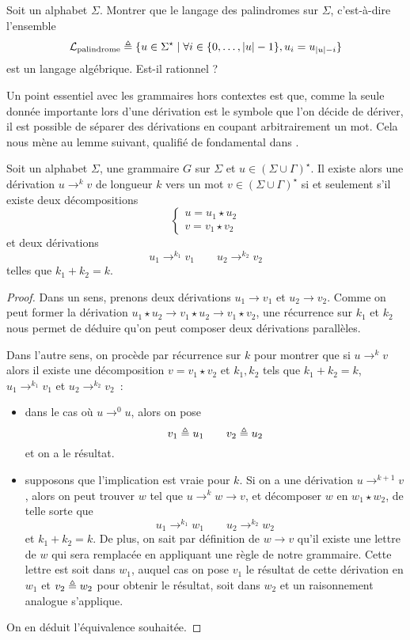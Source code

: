 \begin{exercise}
  Soit un alphabet $\Sigma$. Montrer que le langage des palindromes sur
  $\Sigma$, c'est-à-dire l'ensemble
  \[\mathcal L_{\mathrm{palindrome}} \triangleq \{u \in \Sigma^\star \mid
  \forall i \in \{0,\ldots,|u|-1\}, u_i = u_{|u|-i}\}\]
  est un langage algébrique. Est-il rationnel ?
\end{exercise}

Un point essentiel avec les grammaires hors contextes est que, comme la seule
donnée importante lors d'une dérivation est le symbole que l'on décide de
dériver, il est possible de séparer des dérivations en coupant arbitrairement un
mot. Cela nous mène au lemme suivant, qualifié de fondamental dans
\cite{carton2008langages}.

\begin{lemma}
  Soit un alphabet $\Sigma$, une grammaire $G$ sur $\Sigma$ et
  $u \in (\Sigma\cup\Gamma)^\star$. Il existe alors une dérivation $u \to^k v$
  de longueur $k$ vers un mot $v \in (\Sigma\cup\Gamma)^\star$ si et seulement
  s'il existe deux décompositions
  \[\begin{cases}u = u_1\star u_2 \\ v = v_1\star v_2\end{cases}\]
  et deux dérivations
  \[ u_1 \to^{k_1} v_1 \qquad u_2 \to^{k_2} v_2\]
  telles que $k_1 + k_2 = k$.
\end{lemma}

\begin{proof}
  Dans un sens, prenons deux dérivations $u_1 \to v_1$ et $u_2\to v_2$. Comme on
  peut former la dérivation $u_1 \star u_2 \to v_1 \star u_2 \to v_1 \star v_2$,
  une récurrence sur $k_1$ et $k_2$ nous permet de déduire qu'on peut composer
  deux dérivations parallèles.

  Dans l'autre sens, on procède par récurrence sur $k$ pour montrer que si
  $u \to^k v$ alors il existe une décomposition $v = v_1\star v_2$ et $k_1,k_2$
  tels que $k_1+k_2 = k$, $u_1\to^{k_1} v_1$ et $u_2\to^{k_2}v_2$~:
  \begin{itemize}
  \item dans le cas où $u \to^0 u$, alors on pose
    \[v_1\triangleq u_1 \qquad v_2 \triangleq u_2\]
    et on a le résultat.
  \item supposons que l'implication est vraie pour $k$. Si on a une dérivation
    $u \to^{k+1} v$, alors on peut trouver $w$ tel que $u \to^k w \to v$, et
    décomposer $w$ en $w_1\star w_2$, de telle sorte que
    \[u_1 \to^{k_1} w_1 \qquad u_2 \to^{k_2} w_2\]
    et $k_1 + k_2 = k$. De plus, on sait par définition de $w \to v$ qu'il
    existe une lettre de $w$ qui sera remplacée en appliquant une règle de notre
    grammaire. Cette lettre est soit dans $w_1$, auquel cas on pose $v_1$ le
    résultat de cette dérivation en $w_1$ et $v_2 \triangleq w_2$ pour obtenir le
    résultat, soit dans $w_2$ et un raisonnement analogue s'applique.
  \end{itemize}

  On en déduit l'équivalence souhaitée.
\end{proof}


